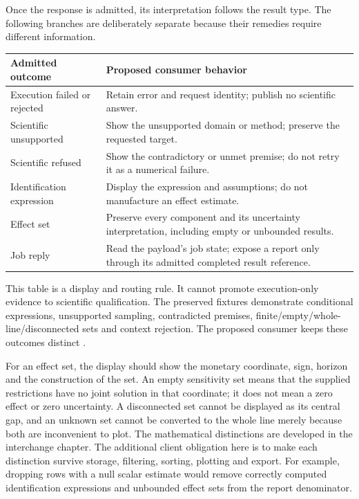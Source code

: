 Once the response is admitted, its interpretation follows the result type.
The following branches are deliberately separate because their remedies
require different information.
\begin{center}
\begin{tabularx}{\textwidth}{P{.24\textwidth}X}
\toprule
Admitted outcome & Proposed consumer behavior \\
\midrule
Execution failed or rejected & Retain error and request identity; publish no scientific answer. \\
Scientific unsupported & Show the unsupported domain or method; preserve the requested target. \\
Scientific refused & Show the contradictory or unmet premise; do not retry it as a numerical failure. \\
Identification expression & Display the expression and assumptions; do not manufacture an effect estimate. \\
Effect set & Preserve every component and its uncertainty interpretation, including empty or unbounded results. \\
Job reply & Read the payload's job state; expose a report only through its admitted completed result reference. \\
\bottomrule
\end{tabularx}
\end{center}
This table is a display and routing rule. It cannot promote execution-only
evidence to scientific qualification. The preserved fixtures demonstrate
conditional expressions, unsupported sampling, contradicted premises,
finite/empty/whole-line/disconnected sets and context rejection. The proposed
consumer keeps these outcomes distinct
\citep{exec13_i2_examples,exec17_integration_review_reference}.

For an effect set, the display should show the monetary coordinate, sign,
horizon and the construction of the set. An empty sensitivity set means that
the supplied restrictions have no joint solution in that coordinate; it does
not mean a zero effect or zero uncertainty. A disconnected set cannot be
displayed as its central gap, and an unknown set cannot be converted to the
whole line merely because both are inconvenient to plot. The mathematical
distinctions are developed in the interchange chapter. The additional client
obligation here is to make each distinction survive storage, filtering,
sorting, plotting and export. For example, dropping rows with a null scalar
estimate would remove correctly computed identification expressions and
unbounded effect sets from the report denominator.


